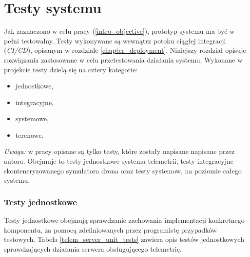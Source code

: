 \chapter{Testy systemu} \label{chapter_tests}

Jak zaznaczono w celu pracy (\ref{intro_objective}), prototyp systemu
ma być w pełni testowalny. Testy wykonywane są wewnątrz potoku ciągłej integracji 
(\textit{CI/CD}), opisanym w rozdziale \ref{chapter_deployment}. Niniejszy rozdział opisuje
rozwiązania zastosowane w celu przetestowania działania systemu.
Wykonane w projekcie testy dzielą się na cztery kategorie:

\begin{itemize}
    \item jednostkowe,
    \item integracyjne,
    \item systemowe,
    \item terenowe.
\end{itemize}

\noindent
\textit{Uwaga:} w pracy opisane są tylko testy, które zostały
napisane napisane przez autora. Obejmuje to testy jednostkowe systemu telemetrii,
testy integracyjne skonteneryzowanego symulatora drona oraz testy systemow,
na poziomie całego systemu.

\subsection{Testy jednostkowe}

Testy jednostkowe obejmują sprawdzanie zachowania implementacji 
konkretnego komponentu, za pomocą zdefiniowanych przez programistę
przypadków testowych. Tabela \ref{telem_server_unit_tests} zawiera 
opis testów jednostkowych sprawdzających działania serwera
obsługującego telemetrię.

